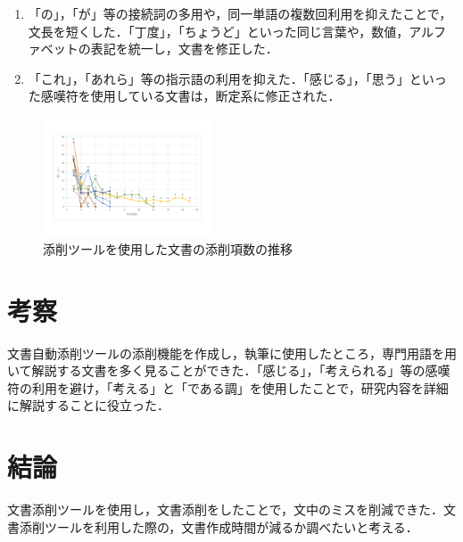 \documentclass[uplatex,twocolumn,dvipdfmx]{jsarticle}
\begin{document}
\begin{enumerate}
\item 「の」，「が」等の接続詞の多用や，同一単語の複数回利用を抑えたことで，文長を短くした．「丁度」，「ちょうど」といった同じ言葉や，数値，アルファベットの表記を統一し，文書を修正した．
\item 「これ」，「あれら」等の指示語の利用を抑えた．「感じる」，「思う」といった感嘆符を使用している文書は，断定系に修正された．
\end{enumerate}

\begin{figure}[htb]
\centering
\includegraphics[width=5cm,clip]{redpen.pdf}
\caption{添削ツールを使用した文書の添削項数の推移}\label{conf}
\end{figure}

\section{考察}
文書自動添削ツールの添削機能を作成し，執筆に使用したところ，専門用語を用いて解説する文書を多く見ることができた．「感じる」，「考えられる」等の感嘆符の利用を避け，「考える」と「である調」を使用したことで，研究内容を詳細に解説することに役立った．

\section{結論}
文書添削ツールを使用し，文書添削をしたことで，文中のミスを削減できた．文書添削ツールを利用した際の，文書作成時間が減るか調べたいと考える．





\end{document}
